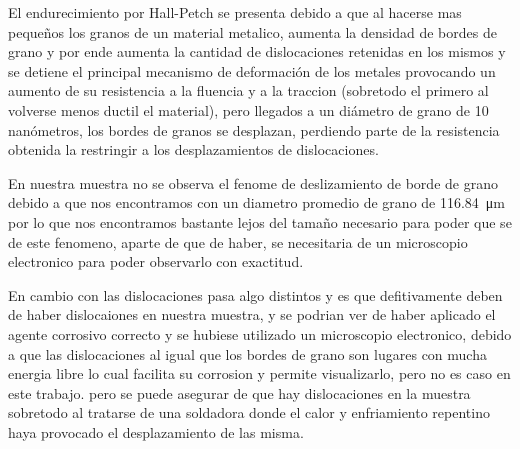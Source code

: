 \documentclass[12pt,a4paper]{article}
\begin{document}
El endurecimiento por Hall-Petch se presenta debido a que al hacerse mas pequeños los granos de un material metalico, aumenta la densidad de bordes de grano y por ende aumenta la cantidad de dislocaciones retenidas en los mismos y se detiene el principal mecanismo de deformación de los metales provocando un aumento de su resistencia a la fluencia y a la traccion (sobretodo el primero al volverse menos ductil el material), pero llegados a un diámetro de grano de 10 nanómetros, los bordes de granos se desplazan, perdiendo parte de la resistencia obtenida la restringir a los desplazamientos de dislocaciones.

En nuestra muestra no se observa el fenome de deslizamiento de borde de grano debido a que nos encontramos con un diametro promedio de grano de \SI{116,84}{\micro\metre} por lo que nos encontramos bastante lejos del tamaño necesario para poder que se de este fenomeno, aparte de que de haber, se necesitaria de un microscopio electronico para poder observarlo con exactitud.

En cambio con las dislocaciones pasa algo distintos y es que defitivamente deben de haber dislocaiones en nuestra muestra, y se podrian ver de haber aplicado el agente corrosivo correcto y se hubiese utilizado un microscopio electronico, debido a que las dislocaciones al igual que los bordes de grano son lugares con mucha energia libre lo cual facilita su corrosion y permite visualizarlo, pero no es caso en este trabajo.
pero se puede asegurar de que hay dislocaciones en la muestra sobretodo al tratarse de una soldadora donde el calor y enfriamiento repentino haya provocado el desplazamiento de las misma.
\end{document}
